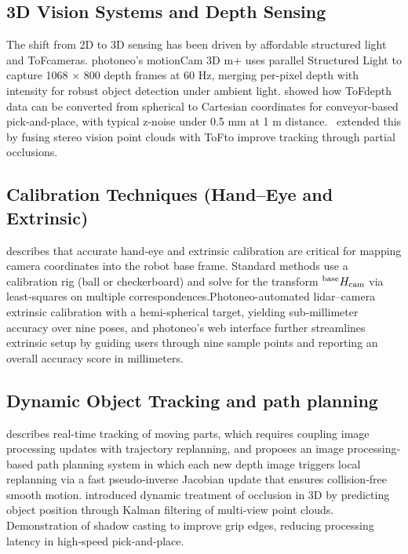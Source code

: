 \documentclass[12pt]{article}
\begin{document}
\subsection{3D Vision Systems and Depth Sensing}
The shift from 2D to 3D sensing has been driven by affordable structured light and ToFcameras\cite{ref2}. photoneo’s motionCam 3D m+ uses parallel Structured Light to capture 1068 × 800 depth frames at 60 Hz, merging per-pixel depth with intensity for robust object detection under ambient light. \cite{ref17} showed how ToFdepth data can be converted from spherical to Cartesian coordinates for conveyor-based pick-and-place, with typical z-noise under 0.5 mm at 1 m distance.\ \cite{ref3} extended this by fusing stereo vision point clouds with ToFto improve tracking through partial occlusions.\\


\subsection{Calibration Techniques (Hand–Eye and Extrinsic)}
\cite{ref3} describes that accurate hand-eye and extrinsic calibration are critical for mapping camera coordinates into the robot base frame. Standard methods use a calibration rig (ball or checkerboard) and solve for the transform ${}^{\rm base}H_{\rm cam}$ via least‐squares on multiple correspondences\cite{ref2}.Photoneo-automated lidar–camera extrinsic calibration with a hemi-spherical target, yielding sub‐millimeter accuracy over nine poses, and photoneo’s web interface further streamlines extrinsic setup by guiding users through nine sample points and reporting an overall accuracy score in millimeters.

\subsection{Dynamic Object Tracking and path planning} \cite{ref1} describes real-time tracking of moving parts, which requires coupling image processing updates with trajectory replanning, and proposes an image processing‐based path planning system in which each new depth image triggers local replanning via a fast pseudo‐inverse Jacobian update that ensures collision‐free smooth motion.\cite{ref4} introduced dynamic treatment of occlusion in 3D by predicting object position through Kalman filtering of multi‐view point clouds.\cite{ref7} Demonstration of shadow casting to improve grip edges, reducing processing latency in high‐speed pick‐and‐place.
\end{document}
